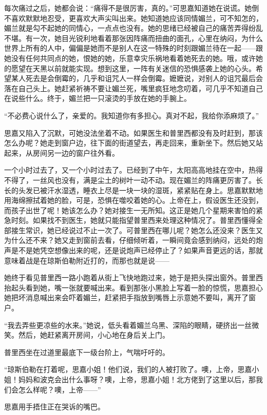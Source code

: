 \par 每次痛过之后，她都会说：“痛得不是很厉害，真的。”可思嘉知道她在说谎。她倒不喜欢默默地忍受，更喜欢大声尖叫出来。她知道她应该同情媚兰，可不知怎的，媚兰就是勾不起她的同情心，一点点也没有。她的思绪已经被自己的痛苦弄得纷乱不堪。有一次，她目光锐利地看着那张因阵痛而扭曲的面孔，心里在纳闷，为什么世界上所有的人中，偏偏是她而不是别人在这一特殊的时刻跟媚兰待在一起——跟她没有任何共同点的她，恨她的她，乐意幸灾乐祸地看着她死去的她。哦，或许她的愿望在天黑以前就能实现。想到这里，一阵有关迷信的恐惧感袭上她的心头。希望某人死去是会倒霉的，几乎和诅咒人一样会倒霉。嬷嬷说，对别人的诅咒最后会落在自己头上。她赶紧祈祷不要让媚兰死，嘴里疯狂地念叨着，可几乎不知道自己在说些什么。终于，媚兰把一只滚烫的手放在她的手腕上。
\par “不必费心说什么了，亲爱的。我知道你有多担心。真对不起，我给你添麻烦了。”
\par 思嘉又陷入了沉默，可她没法坐着不动。如果医生和普里西都没有及时赶到，那该怎么办呢？她走到窗户边，往下面的街道望去，再走回来，重新坐下。然后她又站起来，从房间另一边的窗户往外看。
\par 一个小时过去了，又一个小时过去了。已经到了中午，太阳高高地挂在空中，热得不得了，一丝风也没有，满是尘土的树叶一动不动。现在媚兰的阵痛更厉害了。长长的头发已被汗水湿透，睡衣上尽是一块一块的湿斑，紧紧贴在身上。思嘉默默地用海绵擦拭着她的脸，可是，恐惧在噬咬着她的心。上帝在上，假设医生还没到，而孩子出世了呢！她该怎么办？她对接生一无所知。这正是她几个星期来害怕的紧急时刻。如果找不到医生，她就只能指望普里西来处理这种情况了。普里西懂得全部接生常识，她已经说过不止一次了。可普里西在哪儿呢？她怎么还没来？医生又为什么还不来？她又走到窗前去看，仔细倾听着，一瞬间竟会感到纳闷，远处的炮声是不是她凭空想像出来的呢，还是说炮声已经停止了？如果声音更远的话，那就意味着战是在琼斯伯勒附近打的，而那也就是说——
\par 她终于看见普里西一路小跑着从街上飞快地跑过来，她于是把头探出窗外。普里西抬起头看到她，嘴一张就要喊出来。看到那张小黑脸上写着一脸的惊慌，思嘉担心她把坏消息喊出来会吓着媚兰，赶紧把手指放到嘴唇上示意她不要叫，离开了窗户。
\par “我去弄些更凉些的水来。”她说，低头看着媚兰乌黑、深陷的眼睛，硬挤出一丝微笑。然后，她赶紧离开房间，小心地在身后关上门。
\par 普里西坐在过道里最底下一级台阶上，气喘吁吁的。
\par “琼斯伯勒在打着呢，思嘉小姐！他们说，我们的人被打败了。噢，上帝，思嘉小姐！妈妈和波克会出什么事呀？噢，上帝，思嘉小姐！北方佬到了这里以后，那我们会怎么样呢？噢，上帝——”
\par 思嘉用手捂住正在哭诉的嘴巴。
